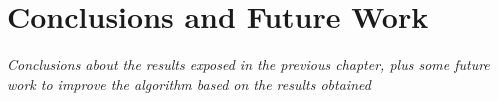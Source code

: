 \chapter{Conclusions and Future Work}
\label{ch:conclusions}

\textit{ {\color{red} Conclusions about the results exposed in the previous chapter, plus some future work to improve the algorithm based on the results obtained }}

%





